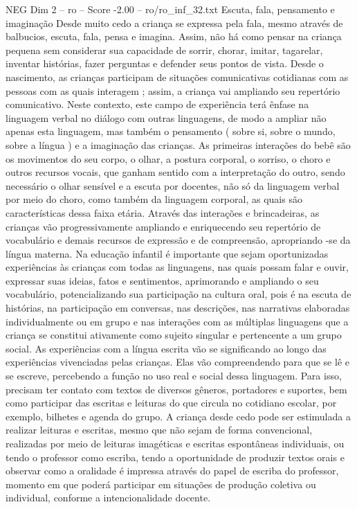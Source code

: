 \begin{textsample}{NEG Dim 2 – ro – Score -2.00 – ro/ro\_inf\_32.txt}  \label{ex:f2_neg_110}
Escuta, fala, pensamento e imaginação Desde muito cedo a criança se expressa pela fala, mesmo através de balbucios, escuta, fala, pensa e imagina.
Assim, não há como pensar na criança pequena sem considerar sua capacidade de sorrir, chorar, imitar, tagarelar, inventar histórias, fazer perguntas e defender seus pontos de vista.
Desde o nascimento, as crianças participam de situações comunicativas cotidianas com as pessoas com as quais interagem ; assim, a criança vai ampliando seu repertório comunicativo.
Neste contexto, este campo de experiência terá ênfase na linguagem verbal no diálogo com outras linguagens, de modo a ampliar não apenas esta linguagem, mas também o pensamento ( sobre si, sobre o mundo, sobre a língua ) e a imaginação das crianças.
As primeiras interações do bebê são os movimentos do seu corpo, o olhar, a postura corporal, o sorriso, o choro e outros recursos vocais, que ganham sentido com a interpretação do outro, sendo necessário o olhar sensível e a escuta por docentes, não só da linguagem verbal por meio do choro, como também da linguagem corporal, as quais são características dessa faixa etária.
Através das interações e brincadeiras, as crianças vão progressivamente ampliando e enriquecendo seu repertório de vocabulário e demais recursos de expressão e de compreensão, apropriando -se da língua materna.
Na educação infantil é importante que sejam oportunizadas experiências às crianças com todas as linguagens, nas quais possam falar e ouvir, expressar suas ideias, fatos e sentimentos, aprimorando e ampliando o seu vocabulário, potencializando sua participação na cultura oral, pois é na escuta de histórias, na participação em conversas, nas descrições, nas narrativas elaboradas individualmente ou em grupo e nas interações com as múltiplas linguagens que a criança se constitui ativamente como sujeito singular e pertencente a um grupo social.
As experiências com a língua escrita vão se significando ao longo das experiências vivenciadas pelas crianças.
Elas vão compreendendo para que se lê e se escreve, percebendo a função no uso real e social dessa linguagem.
Para isso, precisam ter contato com textos de diversos gêneros, portadores e suportes, bem como participar das escritas e leituras do que circula no cotidiano escolar, por exemplo, bilhetes e agenda do grupo.
A criança desde cedo pode ser estimulada a realizar leituras e escritas, mesmo que não sejam de forma convencional, realizadas por meio de leituras imagéticas e escritas espontâneas individuais, ou tendo o professor como escriba, tendo a oportunidade de produzir textos orais e observar como a oralidade é impressa através do papel de escriba do professor, momento em que poderá participar em situações de produção coletiva ou individual, conforme a intencionalidade docente.

\end{textsample}
